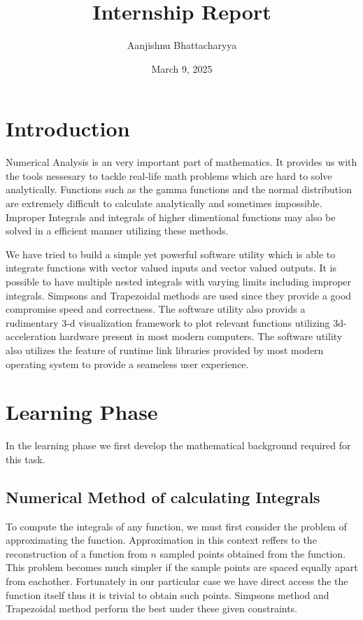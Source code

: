 \documentclass[12pt]{article}
\title{Internship Report}
\date{March 9, 2025}
\author{Aanjishnu Bhattacharyya}
\begin{document}
\maketitle
\tableofcontents
\newpage

\section{Introduction}

Numerical Analysis is an very important part of mathematics. It provides us with the tools nessesary to tackle
real-life math problems which are hard to solve analytically. Functions such as the gamma functions and the normal
distribution are extremely difficult to calculate analytically and sometimes impossible. Improper Integrals and
integrals of higher dimentional functions may also be solved in a efficient manner utilizing these methods.

We have tried to build a simple yet powerful software utility which is able to integrate functions with vector valued
inputs and vector valued outputs. It is possible to have multiple nested integrals with varying limits including improper
integrals. Simpsons and Trapezoidal methods are used since they provide a good compromise speed and correctness.
The software utility also provids a rudimentary 3-d visualization framework to plot relevant functions utilizing 3d-acceleration 
hardware present in most modern computers. The software utility also utilizes the feature of runtime link libraries
provided by most modern operating system to provide a seameless user experience.

\section{Learning Phase}

In the learning phase we first develop the mathematical background required for this task.

\subsection{Numerical Method of calculating Integrals}

To compute the integrals of any function, we must first consider the problem of approximating the function.
Approximation in this context reffers to the reconstruction of a function from $n$ sampled points obtained
from the function. This problem becomes much simpler if the sample points are spaced equally apart from eachother.
Fortunately in our particular case we have direct access the the function itself thus it is trivial to obtain such
points. Simpsons method and Trapezoidal method perform the best under these given constraints.
\break
\break
\end{document}
